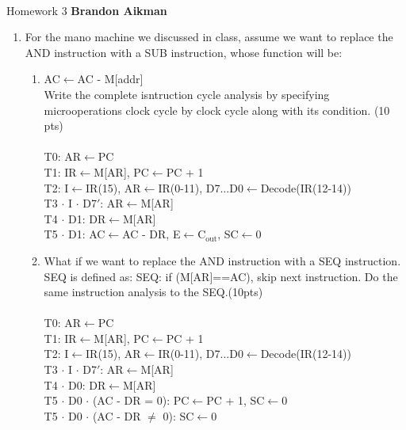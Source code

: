 \documentclass[12pt]{article}
\begin{document}
 \\
Homework 3 \hfill {\bf Brandon Aikman} \\

\begin{enumerate}
	\item For the mano machine we discussed in class, assume we want to replace the AND instruction with a SUB instruction, whose function will be:
	\begin{enumerate}
		\item AC$\leftarrow$AC - M[addr]\\
		Write the complete isntruction cycle analysis by specifying microoperations clock cycle by clock cycle along with its condition. (10 pts)\\\\
		T0: AR$\leftarrow$PC\\
		T1: IR$\leftarrow$M[AR], PC$\leftarrow$PC + 1\\
		T2: I$\leftarrow$IR(15), AR$\leftarrow$IR(0-11), D7...D0$\leftarrow$Decode(IR(12-14))\\
		T3 $\cdot$ I $\cdot$ D7$'$: AR$\leftarrow$M[AR]\\
		T4 $\cdot$ D1: DR$\leftarrow$M[AR]\\
		T5 $\cdot$ D1: AC$\leftarrow$AC - DR, E$\leftarrow$C$_{\mbox{out}}$, SC$\leftarrow$0\\  
		\item What if we want to replace the AND instruction with a SEQ instruction. SEQ is defined as: SEQ: if (M[AR]==AC), skip next instruction. Do the same instruction analysis to the SEQ.(10pts)\\\\
		T0: AR$\leftarrow$PC\\
		T1: IR$\leftarrow$M[AR], PC$\leftarrow$PC + 1\\
		T2: I$\leftarrow$IR(15), AR$\leftarrow$IR(0-11), D7...D0$\leftarrow$Decode(IR(12-14))\\
		T3 $\cdot$ I $\cdot$ D7$'$: AR$\leftarrow$M[AR]\\
		T4 $\cdot$ D0: DR$\leftarrow$M[AR]\\
		T5 $\cdot$ D0 $\cdot$ (AC - DR = 0): PC$\leftarrow$PC + 1, SC$\leftarrow$0\\
		T5 $\cdot$ D0 $\cdot$ (AC - DR $\neq$ 0): SC$\leftarrow$0\\
	\end{enumerate}
	

\end{enumerate}
\end{document}
